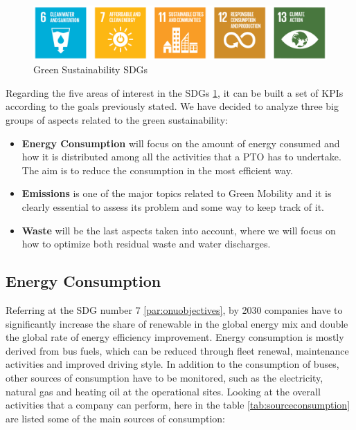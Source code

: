\begin{figure}[!ht]
    \centering
    \includegraphics[width=1\textwidth]{Images/Green Sustainability/SDGs green.png}
    \caption{Green Sustainability SDGs}
    \label{fig:grsussdg}
\end{figure}

Regarding the five areas of interest in the SDGs \ref{fig:grsussdg}, it can be built a set of KPIs according to the goals previously stated.
We have decided to analyze three big groups of aspects related to the green sustainability:

\begin{itemize}
    \item \textbf{Energy Consumption} will focus on the amount of energy consumed and how it is distributed among all the activities that a PTO has to undertake. The aim is to reduce the consumption in the most efficient way.
    \item \textbf{Emissions} is one of the major topics related to Green Mobility and it is clearly essential to assess its problem and some way to keep track of it.
    \item \textbf{Waste} will be the last aspects taken into account, where we will focus on how to optimize both residual waste and water discharges.
\end{itemize}

\subsection{Energy Consumption}
\label{subsec:enecons}
Referring at the SDG number 7 \ref{par:onuobjectives}, by 2030 companies have to significantly increase the share of renewable in the global energy mix and double the global rate of energy efficiency improvement.
Energy consumption is mostly derived from bus fuels, which can be reduced through fleet renewal, maintenance activities and improved driving style. In addition to the consumption of buses, other sources of consumption have to be monitored, such as the electricity, natural gas and heating oil at the operational sites.
Looking at the overall activities that a company can perform, here in the table \ref{tab:sourceconsumption} are listed some of the main sources of consumption:

